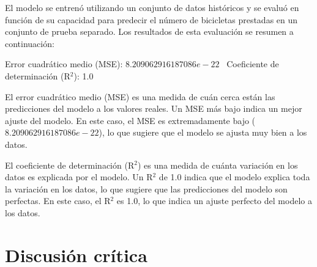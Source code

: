 \documentclass{wsdcr}
\begin{document}
El modelo se entrenó utilizando un conjunto de datos históricos y se evaluó en función de su capacidad para predecir el número de bicicletas prestadas en un conjunto de prueba separado. Los resultados de esta evaluación se resumen a continuación:

Error cuadrático medio (MSE): $8.209062916187086e-22$ \
Coeficiente de determinación (R$^2$): 1.0

El error cuadrático medio (MSE) es una medida de cuán cerca están las predicciones del modelo a los valores reales. Un MSE más bajo indica un mejor ajuste del modelo. En este caso, el MSE es extremadamente bajo ($8.209062916187086e-22$), lo que sugiere que el modelo se ajusta muy bien a los datos.

El coeficiente de determinación (R$^2$) es una medida de cuánta variación en los datos es explicada por el modelo. Un R$^2$ de 1.0 indica que el modelo explica toda la variación en los datos, lo que sugiere que las predicciones del modelo son perfectas. En este caso, el R$^2$ es 1.0, lo que indica un ajuste perfecto del modelo a los datos.

\section{Discusión crítica}













\end{document}
